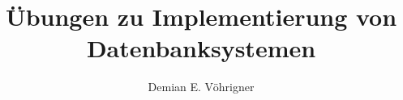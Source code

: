 \title[UeIDB]{Übungen zu \glqq Implementierung von Datenbanksystemen\grqq}
\author{Demian E. Vöhrigner}

